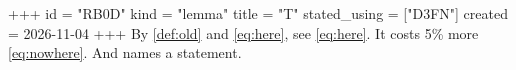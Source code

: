 +++
id = "RB0D"
kind = "lemma"
title = "T"
stated_using = ["D3FN"]
created = 2026-11-04
+++
By \ref{def:old} and \eqref{eq:here}, see \ref{eq:here}. %
It costs 5\% more \ref{eq:nowhere}.
And  names a statement.
